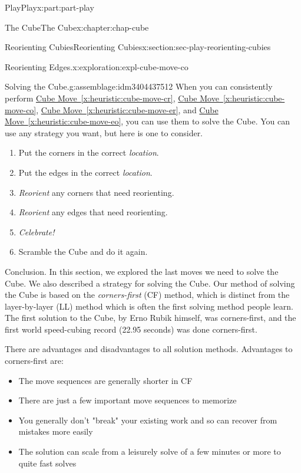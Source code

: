 \documentclass[oneside,10pt,]{book}
\newcommand{\xreffont}{\relax}
\numberwithin{equation}{section}
\begin{document}
\begin{partptx}{Play}{}{Play}{}{}{x:part:part-play}
\begin{chapterptx}{The Cube}{}{The Cube}{}{}{x:chapter:chap-cube}
\begin{sectionptx}{Reorienting Cubies}{}{Reorienting Cubies}{}{}{x:section:sec-play-reorienting-cubies}
\begin{exploration}{Reorienting Edges.}{x:exploration:expl-cube-move-co}
\end{exploration}%
\begin{assemblage}{Solving the Cube.}{g:assemblage:idm3404437512}%
When you can consistently perform \hyperref[x:heuristic:cube-move-cr]{Cube Move~{\xreffont\ref{x:heuristic:cube-move-cr}}}, \hyperref[x:heuristic:cube-move-co]{Cube Move~{\xreffont\ref{x:heuristic:cube-move-co}}}, \hyperref[x:heuristic:cube-move-er]{Cube Move~{\xreffont\ref{x:heuristic:cube-move-er}}}, and \hyperref[x:heuristic:cube-move-eo]{Cube Move~{\xreffont\ref{x:heuristic:cube-move-eo}}}, you can use them to solve the Cube. You can use any strategy you want, but here is one to consider.%
\begin{enumerate}
\item{}Put the corners in the correct \emph{location}.%
\item{}Put the edges in the correct \emph{location}.%
\item{}\emph{Reorient} any corners that need reorienting.%
\item{}\emph{Reorient} any edges that need reorienting.%
\item{}\emph{Celebrate!}%
\item{}Scramble the Cube and do it again.%
\end{enumerate}
%
\end{assemblage}
\begin{conclusion}{Conclusion.}%
In this section, we explored the last moves we need to solve the Cube. We also described a strategy for solving the Cube. Our method of solving the Cube is based on the \emph{corners-first} (CF) method, which is distinct from the layer-by-layer (LL) method which is often the first solving method people learn. The first solution to the Cube, by Erno Rubik himself, was corners-first, and the first world speed-cubing record (22.95 seconds) was done corners-first.%
\par
There are advantages and disadvantages to all solution methods. Advantages to corners-first are:%
\begin{itemize}[label=\textbullet]
\item{}The move sequences are generally shorter in CF%
\item{}There are just a few important move sequences to memorize%
\item{}You generally don't "break" your existing work and so can recover from mistakes more easily%
\item{}The solution can scale from a leisurely solve of a few minutes or more to quite fast solves%

\end{itemize}
\end{conclusion}
\end{sectionptx}
\end{chapterptx}
\end{partptx}
\end{document}
